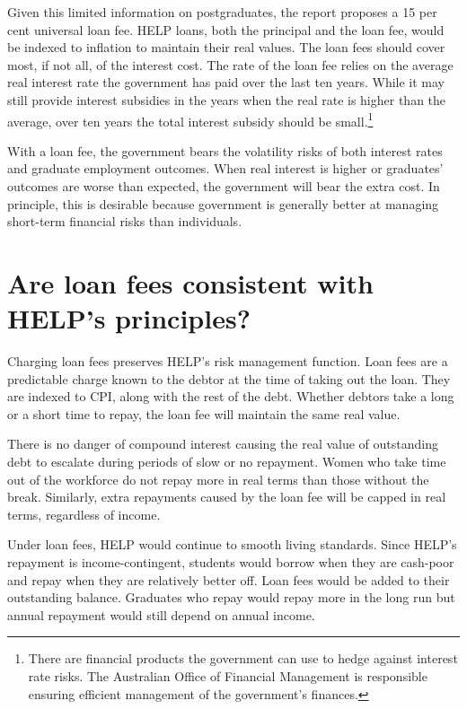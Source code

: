 \documentclass[]{book}
\begin{document}
Given this limited information on postgraduates, the report proposes a 15 per cent universal loan fee. HELP loans, both the principal and the loan fee, would be indexed to inflation to maintain their real values. The loan fees should cover most, if not all, of the interest cost. The rate of the loan fee relies on the average real interest rate the government has paid over the last ten years. While it may still provide interest subsidies in the years when the real rate is higher than the average, over ten years the total interest subsidy should be small.\footnote{There are financial products the government can use to hedge against interest rate risks. The Australian Office of Financial Management is responsible ensuring efficient management of the government's finances.}

With a loan fee, the government bears the volatility risks of both interest rates and graduate employment outcomes. When real interest is higher or graduates' outcomes are worse than expected, the government will bear the extra cost. In principle, this is desirable because government is generally better at managing short-term financial risks than individuals.

\section{Are loan fees consistent with HELP's principles? }\label{are-loan-fees-consistent-with-helps-principles}

Charging loan fees preserves HELP's risk management function. Loan fees are a predictable charge known to the debtor at the time of taking out the loan. They are indexed to CPI, along with the rest of the debt. Whether debtors take a long or a short time to repay, the loan fee will maintain the same real value.

There is no danger of compound interest causing the real value of outstanding debt to escalate during periods of slow or no repayment. Women who take time out of the workforce do not repay more in real terms than those without the break. Similarly, extra repayments caused by the loan fee will be capped in real terms, regardless of income.

Under loan fees, HELP would continue to smooth living standards. Since HELP's repayment is income-contingent, students would borrow when they are cash-poor and repay when they are relatively better off. Loan fees would be added to their outstanding balance. Graduates who repay would repay more in the long run but annual repayment would still depend on annual income.
\end{document}
